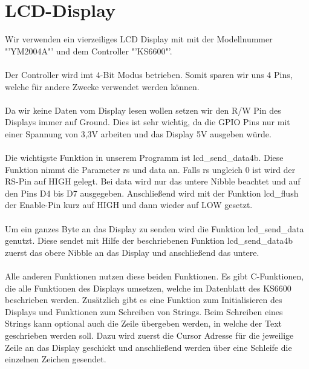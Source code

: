 \section{LCD-Display}

Wir verwenden ein vierzeiliges LCD Display mit mit der Modellnummer "'YM2004A"' und dem Controller "'KS6600"'.\\
\\
Der Controller wird imt 4-Bit Modus betrieben. Somit sparen wir uns 4 Pins, welche für andere Zwecke verwendet werden können.\\
\\
Da wir keine Daten vom Display lesen wollen setzen wir den R/W Pin des Displays immer auf Ground. Dies ist sehr wichtig, da die GPIO Pins nur mit einer Spannung von 3,3V arbeiten und das Display 5V ausgeben würde.\\
\\
Die wichtigste Funktion in unserem Programm ist lcd\_send\_data4b. Diese Funktion nimmt die Parameter rs und data an. Falls rs ungleich 0 ist wird der RS-Pin auf HIGH gelegt. Bei data wird nur das untere Nibble beachtet und auf den Pins D4 bis D7 ausgegeben. Anschließend wird mit der Funktion lcd\_flush der Enable-Pin kurz auf HIGH und dann wieder auf LOW gesetzt.\\
\\
Um ein ganzes Byte an das Display zu senden wird die Funktion lcd\_send\_data genutzt. Diese sendet mit Hilfe der beschriebenen Funktion lcd\_send\_data4b zuerst das obere Nibble an das Display und anschließend das untere.\\
\\
Alle anderen Funktionen nutzen diese beiden Funktionen. Es gibt C-Funktionen, die alle Funktionen des Displays umsetzen, welche im Datenblatt des KS6600 beschrieben werden. Zusätzlich gibt es eine Funktion zum Initialisieren des Displays und Funktionen zum Schreiben von Strings. Beim Schreiben eines Strings kann optional auch die Zeile übergeben werden, in welche der Text geschrieben werden soll. Dazu wird zuerst die Cursor Adresse für die jeweilige Zeile an das Display geschickt und anschließend werden über eine Schleife die einzelnen Zeichen gesendet.
